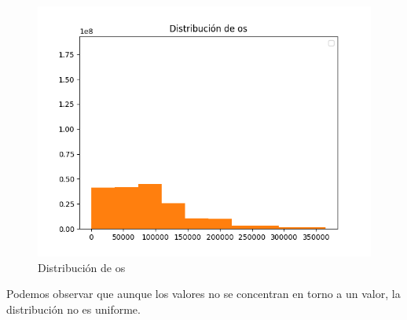 	\begin{figure}[H]
	\centering
	\includegraphics[scale=0.5]{img/os_distribution.png}
	\caption{Distribución de os}
	\end{figure}
Podemos observar que aunque los valores no se concentran en torno a un valor, la distribución no es uniforme.
\medskip

